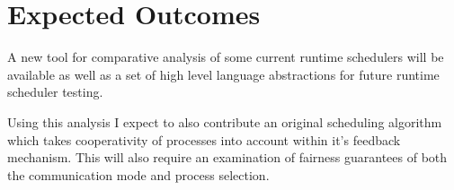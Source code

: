 \documentclass[11pt]{artikel3}
\begin{document}
\section{Expected Outcomes}

A new tool for comparative analysis of some current runtime schedulers will be available as well as a
set of high level language abstractions for future runtime scheduler testing.

Using this analysis I expect to also contribute an original scheduling algorithm which takes cooperativity
of processes into account within it's feedback mechanism. This will also require an examination of fairness
guarantees of both the communication mode and process selection.

\nocite{*}


\end{document}
